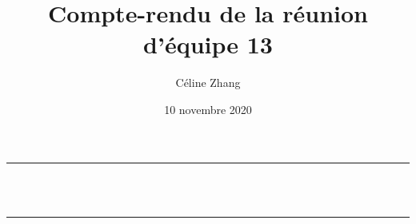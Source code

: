 \documentclass[12pt]{article}
\title{Compte-rendu de la réunion d'équipe 13}
\author{Céline Zhang}
\date{10 novembre 2020}
\makeatletter
\let\thetitle\@title
\makeatother
\begin{document}
\vspace*{0 cm}
	\begin{center}
		\rule{\linewidth}{0.2 mm} \\[0.5 cm]
		{\huge \bfseries \thetitle}\\[0.1 cm]
		\rule{\linewidth}{0.2 mm} \\[0 cm]
	\end{center}
\end{document}
